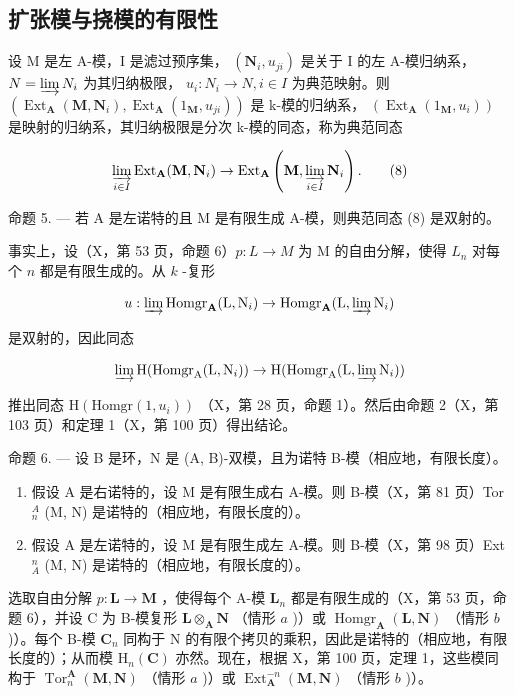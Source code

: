 \subsection{扩张模与挠模的有限性}

设 M 是左 A-模，I 是滤过预序集， \((\mathbf{N}_{i}, u_{ji})\) 是关于 I 的左 A-模归纳系， \(N = \varinjlim N_{i}\) 为其归纳极限， \(u_{i}: N_{i} \to N, i \in I\) 为典范映射。则 \((\operatorname{Ext}_{\mathbf{A}}(\mathbf{M}, \mathbf{N}_{i}), \operatorname{Ext}_{\mathbf{A}}(1_{\mathbf{M}}, u_{ji}))\) 是 k-模的归纳系， \((\operatorname{Ext}_{\mathbf{A}}(1_{\mathbf{M}}, u_{i}))\) 是映射的归纳系，其归纳极限是分次 k-模的同态，称为典范同态

\[
\varinjlim_ {i \in I} \operatorname{Ext} _ {\mathbf {A}} (\mathbf {M}, \mathbf {N} _ {i}) \rightarrow \operatorname{Ext} _ {\mathbf {A}} \left(\mathbf {M}, \varinjlim_ {i \in I} \mathbf {N} _ {i}\right).\tag{8}
\]

命题 5. --- 若 A 是左诺特的且 M 是有限生成 A-模，则典范同态 (8) 是双射的。

事实上，设（X，第 53 页，命题 6）\(p: L \to M\) 为 M 的自由分解，使得 \(L_{n}\) 对每个 \(n\) 都是有限生成的。从 \(k\) -复形

\[
u: \varinjlim \operatorname{Homgr} _ {\mathbf {A}} (\mathrm{L}, \mathrm{N} _ {i}) \rightarrow \operatorname{Homgr} _ {\mathbf {A}} (\mathrm{L}, \varinjlim \mathrm{N} _ {i})
\]

是双射的，因此同态

\[
\varinjlim \mathrm{H} (\operatorname{Homgr} _ {\mathrm{A}} (\mathrm{L}, \mathrm{N} _ {i})) \rightarrow \mathrm{H} (\operatorname{Homgr} _ {\mathrm{A}} (\mathrm{L}, \varinjlim \mathrm{N} _ {i}))
\]

推出同态 \(\mathrm{H}(\mathrm{Homgr}(1,u_{i}))\) （X，第 28 页，命题 1）。然后由命题 2（X，第 103 页）和定理 1（X，第 100 页）得出结论。

命题 6. --- 设 B 是环，N 是 (A, B)-双模，且为诺特 B-模（相应地，有限长度）。

\begin{enumerate}
\def\labelenumi{\alph{enumi})}
\item
  假设 A 是右诺特的，设 M 是有限生成右 A-模。则 B-模（X，第 81 页）Tor \(_{n}^{A}\) (M, N) 是诺特的（相应地，有限长度的）。
\item
  假设 A 是左诺特的，设 M 是有限生成左 A-模。则 B-模（X，第 98 页）Ext \(_{A}^{n}\) (M, N) 是诺特的（相应地，有限长度的）。
\end{enumerate}

选取自由分解 \(p: \mathbf{L} \to \mathbf{M}\) ，使得每个 A-模 \(\mathbf{L}_n\) 都是有限生成的（X，第 53 页，命题 6），并设 C 为 B-模复形 \(\mathbf{L} \otimes_{\mathbf{A}} \mathbf{N}\) （情形 \(a\) )）或 \(\operatorname{Homgr}_{\mathbf{A}}(\mathbf{L}, \mathbf{N})\) （情形 \(b\) )）。每个 B-模 \(\mathbf{C}_n\) 同构于 N 的有限个拷贝的乘积，因此是诺特的（相应地，有限长度的）；从而模 \(\mathrm{H}_n(\mathbf{C})\) 亦然。现在，根据 X，第 100 页，定理 1，这些模同构于 \(\operatorname{Tor}_n^{\mathbf{A}}(\mathbf{M}, \mathbf{N})\) （情形 \(a\) )）或 \(\operatorname{Ext}_{\mathbf{A}}^{-n}(\mathbf{M}, \mathbf{N})\) （情形 \(b\) )）。

